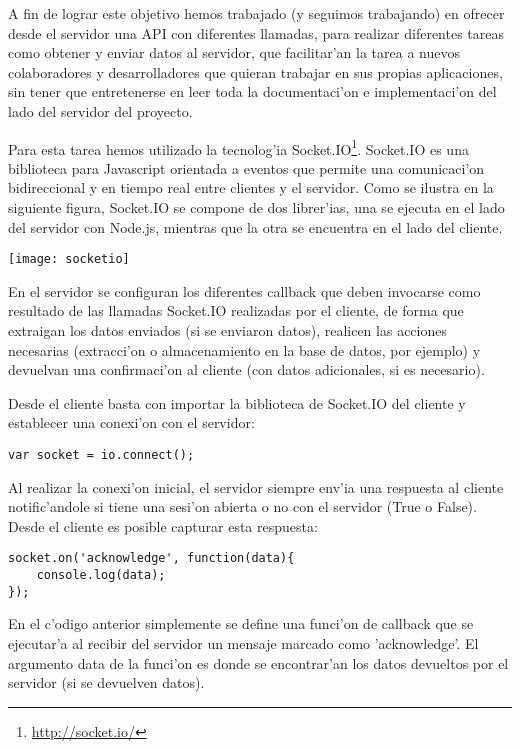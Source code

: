 A fin de lograr este objetivo hemos trabajado (y seguimos trabajando) en ofrecer desde el servidor una API con
diferentes llamadas, para realizar diferentes tareas como obtener y enviar datos al servidor, que facilitar'an la
tarea a nuevos colaboradores y desarrolladores que quieran trabajar en sus propias aplicaciones, sin tener que
entretenerse en leer toda la documentaci'on e implementaci'on del lado del servidor del proyecto.

Para esta tarea hemos utilizado la tecnolog'ia Socket.IO\footnote{\url{http://socket.io/}}. Socket.IO es una 
biblioteca para Javascript orientada a eventos que permite una comunicaci'on bidireccional y en tiempo real 
entre clientes y el servidor. Como se ilustra en la siguiente figura, Socket.IO se compone de dos librer'ias, una se 
ejecuta en el lado del servidor con Node.js, mientras que la otra se encuentra en el lado del cliente.

\begin{center}
\texttt{[image: socketio]}
\end{center}

En el servidor se configuran los diferentes callback que deben invocarse como resultado de las llamadas Socket.IO
realizadas por el cliente, de forma que extraigan los datos enviados (si se enviaron datos), realicen las acciones
necesarias (extracci'on o almacenamiento en la base de datos, por ejemplo) y devuelvan una confirmaci'on al cliente
(con datos adicionales, si es necesario).

Desde el cliente basta con importar la biblioteca de Socket.IO del cliente y establecer una conexi'on con el servidor:

\begin{verbatim}
var socket = io.connect();
\end{verbatim}

Al realizar la conexi'on inicial, el servidor siempre env'ia una respuesta al cliente notific'andole si tiene una
sesi'on abierta o no con el servidor (True o False). Desde el cliente es posible capturar esta respuesta:

\begin{verbatim}
socket.on('acknowledge', function(data){
    console.log(data);
});
\end{verbatim}

En el c'odigo anterior simplemente se define una funci'on de callback que se ejecutar'a al recibir del servidor un
mensaje marcado como 'acknowledge'. El argumento data de la funci'on es donde se encontrar'an los datos devueltos
por el servidor (si se devuelven datos).

